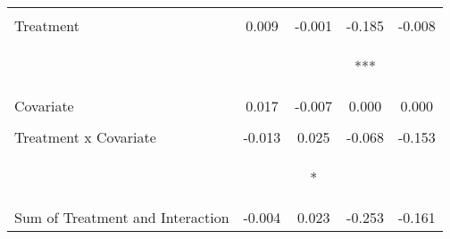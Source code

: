\begin{tabular}{lcccc}
 & \begin{footnotesize}\end{footnotesize} & \begin{footnotesize}\end{footnotesize} & \begin{footnotesize}\end{footnotesize} & \begin{footnotesize}\end{footnotesize}\\
\noalign{\smallskip}Treatment & 0.009 & -0.001 & -0.185 & -0.008\\
 & \begin{footnotesize}[0.011]\end{footnotesize} & \begin{footnotesize}[0.005]\end{footnotesize} & \begin{footnotesize}[0.051]***\end{footnotesize} & \begin{footnotesize}[0.050]\end{footnotesize}\\
\noalign{\smallskip}Covariate & 0.017 & -0.007 & 0.000 & 0.000\\
 & \begin{footnotesize}[0.024]\end{footnotesize} & \begin{footnotesize}[0.015]\end{footnotesize} & \begin{footnotesize}[0.000]\end{footnotesize} & \begin{footnotesize}[0.000]\end{footnotesize}\\
\noalign{\smallskip}Treatment x Covariate & -0.013 & 0.025 & -0.068 & -0.153\\
 & \begin{footnotesize}[0.026]\end{footnotesize} & \begin{footnotesize}[0.013]*\end{footnotesize} & \begin{footnotesize}[0.143]\end{footnotesize} & \begin{footnotesize}[0.138]\end{footnotesize}\\
\noalign{\smallskip}Sum of Treatment and Interaction & -0.004 & 0.023 & -0.253 & -0.161\\

\end{tabular}
